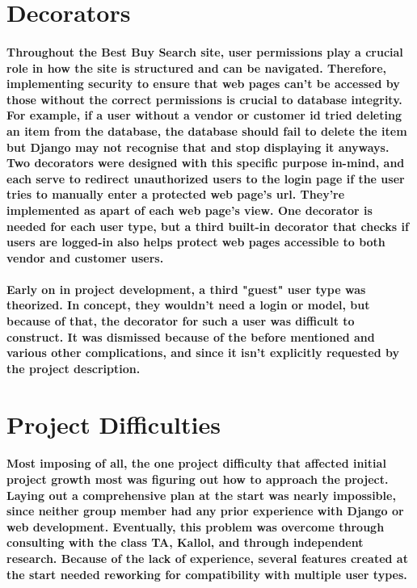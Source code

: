 \documentclass[sigconf]{acmart}
\begin{document}
\section{Decorators}

\paragraph{ Throughout the Best Buy Search site, user permissions play a crucial role in how the site is structured and can be navigated. Therefore, implementing security to ensure that web pages can't be accessed by those without the correct permissions is crucial to database integrity. For example, if a user without a vendor or customer id tried deleting an item from the database, the database should fail to delete the item but Django may not recognise that and stop displaying it anyways. Two decorators were designed with this specific purpose in-mind, and each serve to redirect unauthorized users to the login page if the user tries to manually enter a protected web page's url. They're implemented as apart of each web page's view. One decorator is needed for each user type, but a third built-in decorator that checks if users are logged-in also helps protect web pages accessible to both vendor and customer users. }

\paragraph{ Early on in project development, a third "guest" user type was theorized. In concept, they wouldn't need a login or model, but because of that, the decorator for such a user was difficult to construct. It was dismissed because of the before mentioned and various other complications, and since it isn't explicitly requested by the project description. }

\section{Project Difficulties}

\paragraph{ Most imposing of all, the one project difficulty that affected initial project growth most was figuring out how to approach the project. Laying out a comprehensive plan at the start was nearly impossible, since neither group member had any prior experience with Django or web development. Eventually, this problem was overcome through consulting with the class TA, Kallol, and through independent research. Because of the lack of experience, several features created at the start needed reworking for compatibility with multiple user types.}  
\end{document}

